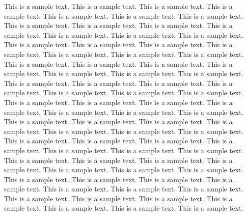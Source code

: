 This is a sample text.
This is a sample text.
This is a sample text.
This is a sample text.
This is a sample text.
This is a sample text.
This is a sample text.
This is a sample text.
This is a sample text.
This is a sample text.
This is a sample text.
This is a sample text.
This is a sample text.
This is a sample text.
This is a sample text.
This is a sample text.
This is a sample text.
This is a sample text.
This is a sample text.
This is a sample text.
This is a sample text.
This is a sample text.
This is a sample text.
This is a sample text.
This is a sample text.
This is a sample text.
This is a sample text.
This is a sample text.
This is a sample text.
This is a sample text.
This is a sample text.
This is a sample text.
This is a sample text.
This is a sample text.
This is a sample text.
This is a sample text.
This is a sample text.
This is a sample text.
This is a sample text.
This is a sample text.
This is a sample text.
This is a sample text.
This is a sample text.
This is a sample text.
This is a sample text.
This is a sample text.
This is a sample text.
This is a sample text.
This is a sample text.
This is a sample text.
This is a sample text.
This is a sample text.
This is a sample text.
This is a sample text.
This is a sample text.
This is a sample text.
This is a sample text.
This is a sample text.
This is a sample text.
This is a sample text.
This is a sample text.
This is a sample text.
This is a sample text.
This is a sample text.
This is a sample text.
This is a sample text.
This is a sample text.
This is a sample text.
This is a sample text.
This is a sample text.
This is a sample text.
This is a sample text.
This is a sample text.
This is a sample text.
This is a sample text.
This is a sample text.
This is a sample text.